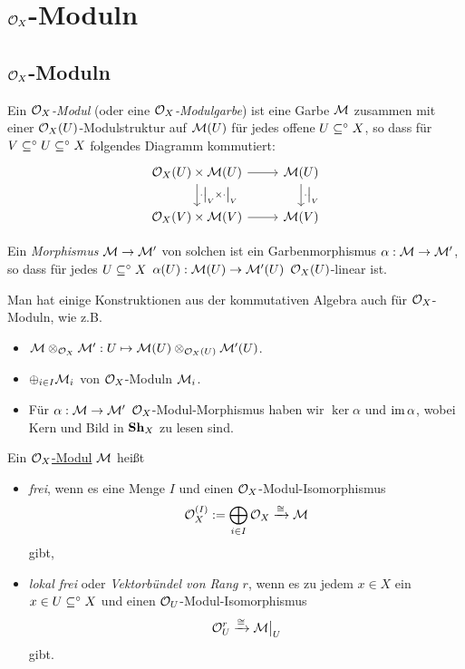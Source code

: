 \section{$\mathcal{O}_X$-Moduln}
\newcommand{\OX}{$\O_X$-}

\subsection{$\mathcal{O}_X$-Moduln}
\begin{definition}[$\mathcal{O}_X$-Modul]
    Ein \emph{$\mathcal{O}_X$-Modul} (oder eine \emph{$\mathcal{O}_X$-Modulgarbe}) ist eine 
    Garbe $\mathcal{M}$ zusammen mit einer $\mathcal{O}_X(U)$-Modulstruktur auf $\mathcal{M}(U)$
    für jedes offene $U\subseteq^\circ X$, so dass für 
    $V \subseteq^\circ U \subseteq^\circ X$ folgendes Diagramm kommutiert:
    \[\begin{tikzcd}
        \O_X(U) \times \M(U) \rar \dar{\cdot\rest V \times \cdot \rest V}
        & \M(U) \dar{\cdot \rest V}\\
        \O_X(V) \times \M(V) \rar & \M(V)
    \end{tikzcd}\]
    
    Ein \emph{Morphismus} $\mathcal{M} \to \mathcal{M}'$ von solchen ist ein Garbenmorphismus
    $\alpha: \mathcal{M}\to \mathcal{M}'$, so dass für jedes $U\subseteq^\circ X$ 
    $\alpha(U):\mathcal{M}(U) \to \mathcal{M}'(U)$ $\mathcal{O}_X(U)$-linear ist.
\end{definition}


\begin{bemerkung}
    Man hat einige Konstruktionen aus der kommutativen Algebra auch für
    \OX Moduln, wie z.B.
    \begin{itemize}
      \item $\mathcal{M} \otimes_{\mathcal{O}_X} \mathcal{M}': U \mapsto \mathcal{M}(U) \otimes_{\mathcal{O}_X(U)} \mathcal{M}'(U)$.
      \item $\oplus_{i\in I} \mathcal{M}_i$ von $\mathcal{O}_X$-Moduln $\mathcal{M}_i$.
      \item Für $\alpha:\mathcal{M}\to \mathcal{M}'$ $\mathcal{O}_X$-Modul-Morphismus haben wir
        $\ker \alpha$ und $\operatorname{im} \alpha$,
        wobei Kern und Bild in $\mathbf{Sh}_X$ zu lesen sind.
    \end{itemize}
\end{bemerkung}


\begin{definition}
    Ein \hyperlink{def:ox modul}{\OX Modul} $\mathcal{M}$ heißt
    \begin{itemize}
      \item \emph{frei}, wenn es eine Menge $I$ und einen 
        \OX Modul-Isomorphismus 
        \[ \mathcal{O}_X^{(I)} := \bigoplus_{i\in I} \mathcal{O}_X \xrightarrow{\cong} \mathcal{M}\]
        gibt,
      \item \emph{lokal frei} oder \emph{Vektorbündel von Rang $r$}, 
        wenn es zu jedem $x\in X$ ein $x \in U\subseteq^\circ X$ und einen
        $\mathcal{O}_U$-Modul-Isomorphismus
        \[ \mathcal{O}_U^r \xrightarrow{\cong} \mathcal{M}\big|_{U}\]
        gibt.
    \end{itemize}
\end{definition}

